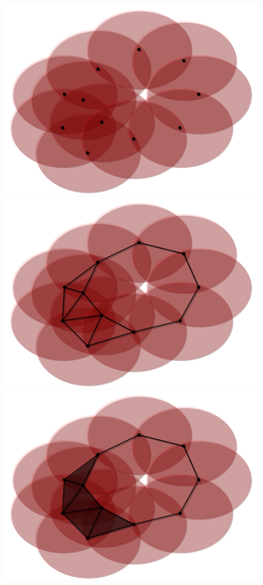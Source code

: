 \begin{figure}[htbp]
\centering
    \includegraphics[scale=0.33]{figures/holes_cover.pdf}
    \includegraphics[scale=0.33]{figures/holes_edges.pdf}
    \includegraphics[scale=0.33]{figures/holes_complex.pdf}
     \caption{}
     \label{fig:holes}
 \end{figure}


